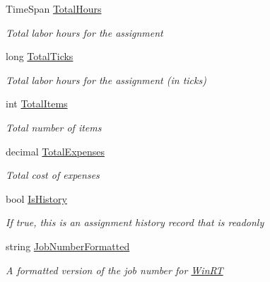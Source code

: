 \begin{DoxyCompactItemize}
Time\+Span \hyperlink{class_field_service_1_1_data_1_1_assignment_a096d96eab35e3f6f410237e33945cd8d}{Total\+Hours}
\begin{DoxyCompactList}\small\item\em Total labor hours for the assignment \end{DoxyCompactList}\item 
long \hyperlink{class_field_service_1_1_data_1_1_assignment_a98568ec9c68653fd325f7088c1515565}{Total\+Ticks}
\begin{DoxyCompactList}\small\item\em Total labor hours for the assignment (in ticks) \end{DoxyCompactList}\item 
int \hyperlink{class_field_service_1_1_data_1_1_assignment_a1ebc0bb4efb6e07b750625f5f0275e02}{Total\+Items}
\begin{DoxyCompactList}\small\item\em Total number of items \end{DoxyCompactList}\item 
decimal \hyperlink{class_field_service_1_1_data_1_1_assignment_a8bcbc11ac213fc8a664e4abad9e2372c}{Total\+Expenses}
\begin{DoxyCompactList}\small\item\em Total cost of expenses \end{DoxyCompactList}\item 
bool \hyperlink{class_field_service_1_1_data_1_1_assignment_a8b2489531f212e5a9ace20b2198a413c}{Is\+History}
\begin{DoxyCompactList}\small\item\em If true, this is an assignment history record that is readonly \end{DoxyCompactList}\item 
string \hyperlink{class_field_service_1_1_data_1_1_assignment_a73c8154ab5178a78917d70350355cdca}{Job\+Number\+Formatted}
\begin{DoxyCompactList}\small\item\em A formatted version of the job number for \hyperlink{namespace_field_service_1_1_win_r_t}{Win\+R\+T} \end{DoxyCompactList}\item 

\end{DoxyCompactItemize}
